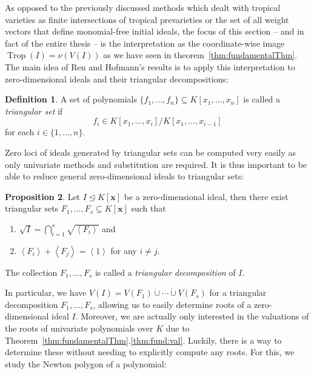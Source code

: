\documentclass[
  paper=a4,
  titlepage,
  bibliography=totoc,
  listof=totoc,
  pagesize=pdftex
]{scrartcl}
\numberwithin{figure}{section}
\numberwithin{equation}{section}
\numberwithin{table}{section}
\newcommand*\dotcup{\mathbin{\dot{\cup}}}
\newcommand*\ideal[1]{\left\langle #1 \right\rangle}
\let\vec\mathbf
\let\idealof\trianglelefteq
\DeclareMathOperator{\Trop}{Trop}
\theoremstyle{definition}
\newtheorem{definition}{Definition}
\newtheorem{proposition}[definition]{Proposition}
\numberwithin{definition}{section}
\begin{document}
As opposed to the previously discussed methods which dealt with tropical varieties as
finite intersections of tropical prevarieties or the set of all weight vectors that define
monomial-free initial ideals, the focus of this section -- and in fact of the entire
thesis -- is the interpretation as the coordinate-wise image $\Trop(I) = \nu(V(I))$ as we
have seen in theorem~\ref{thm:fundamentalThm}. The main idea of Ren and Hofmann's results
is to apply this interpretation to zero-dimensional ideals and their triangular
decompositions:

\begin{definition}
  \label{def:triangSet}
  A set of polynomials $\{ f_1, \dots, f_n \} \subseteq K[x_1, \dots, x_n]$ is called a
  \emph{triangular set} if
  \[
    f_i \in K[x_1, \dots, x_i] / K[x_1, \dots, x_{i-1}]
  \]
  for each $i \in \{1, \dots, n\}$.
\end{definition}

Zero loci of ideals generated by triangular sets can be computed very easily as only
univariate methods and substitution are required. It is thus important to be able to
reduce general zero-dimensional ideals to triangular sets:

\begin{proposition}
  Let $I \idealof K[\vec x]$ be a zero-dimensional ideal, then there exist triangular sets
  $F_1, \dots, F_s \subseteq K[\vec x]$ such that
  \begin{enumerate}
    \item $\sqrt I = \bigcap_{i=1}^s \sqrt{\ideal{F_i}}$ and
    \item $\ideal{F_i} + \ideal{F_j} = \ideal1$ for any $i\neq j$.
  \end{enumerate}
  The collection $F_1, \dots, F_s$ is called a \emph{triangular decomposition} of $I$.
  \label{prp:triang}
\end{proposition}

In particular, we have $V(I) = V(F_1) \dotcup \cdots \dotcup V(F_s)$ for a triangular
decomposition $F_1, \dots, F_s$, allowing us to easily determine roots of a
zero-dimensional ideal $I$. Moreover, we are actually only interested in the valuations of
the roots of univariate polynomials over $K$ due to
Theorem~\ref{thm:fundamentalThm}.\ref{thm:fund:val}. Luckily, there is a way to determine
these without needing to explicitly compute any roots. For this, we study the Newton
polygon of a polynomial:
\end{document}

